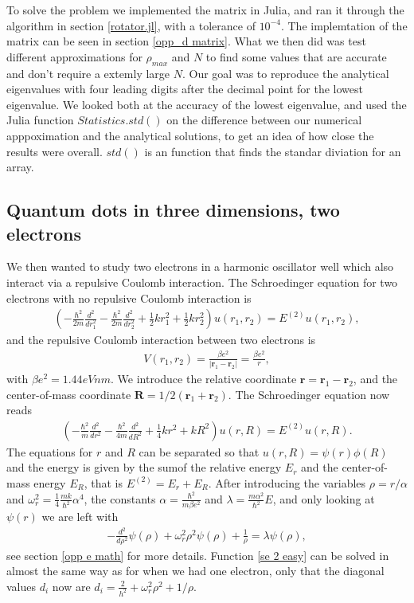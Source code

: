 \documentclass[a4paper]{article}
\begin{document}
To solve the problem we implemented the matrix in Julia, and ran it through the algorithm in section \ref{rotator.jl}, with a tolerance of $10^{-4}$. The implemtation of the matrix can be seen in section \ref{opp_d matrix}. What we then did was test different approximations for $\rho_{max}$ and $N$ to find some values that are accurate and don't require a extemly large $N$. Our goal was to reproduce the analytical eigenvalues with four leading digits after the decimal point for the lowest eigenvalue. We looked both at the accuracy of the lowest eigenvalue, and used the Julia function $Statistics.std()$ on the difference between our numerical apppoximation and the analytical solutions, to get an idea of how close the results were overall. $std()$ is an function that finds the standar diviation for an array.


\subsection{Quantum dots in three dimensions, two electrons}
We then wanted to study two electrons in a harmonic oscillator well which also interact via a repulsive Coulomb interaction. The Schroedinger equation for two electrons with no repulsive Coulomb interaction is
\begin{align}
\left(  -\frac{\hbar^2}{2 m} \frac{d^2}{dr_1^2} -\frac{\hbar^2}{2 m} \frac{d^2}{dr_2^2}+ \frac{1}{2}k r_1^2+ \frac{1}{2}k r_2^2\right)u(r_1,r_2)  = E^{(2)} u(r_1,r_2) ,
\end{align}
and the repulsive Coulomb interaction between two electrons is
\begin{align}
V(r_1,r_2) = \frac{\beta e^2}{|\mathbf{r}_1-\mathbf{r}_2|}=\frac{\beta e^2}{r},
\end{align}
with $ \beta e^2 = 1.44 eVnm$. We introduce the relative coordinate $\mathbf{r} = \mathbf{r}_1-\mathbf{r}_2$, and the center-of-mass coordinate $\mathbf{R} = 1/2(\mathbf{r}_1+\mathbf{r}_2)$. The Schroedinger equation now reads
\begin{align}
\left(  -\frac{\hbar^2}{m} \frac{d^2}{dr^2} -\frac{\hbar^2}{4 m} \frac{d^2}{dR^2}+ \frac{1}{4} k r^2+  kR^2\right)u(r,R)  = E^{(2)} u(r,R).
\end{align}
The equations for $r$ and $R$ can be separated so that $u(r,R) = \psi(r)\phi(R)$ and the energy is given by the sumof the relative energy $E_r$ and the center-of-mass energy $E_R$, that is $ E^{(2)} = E_r + E_R$. After introducing the variables $\rho = r/\alpha$ and $\omega_r^2=\frac{1}{4}\frac{mk}{\hbar^2} \alpha^4$, the constants $\alpha = \frac{\hbar^2}{m\beta e^2}$ and $\lambda = \frac{m\alpha^2}{\hbar^2}E$, and only looking at $\psi (r)$ we are left with 
\begin{align}
  -\frac{d^2}{d\rho^2} \psi(\rho) + \omega_r^2\rho^2\psi(\rho) +\frac{1}{\rho} = \lambda \psi(\rho), \label{se 2 easy}
\end{align}
see section \ref{opp e math} for more details. Function \ref{se 2 easy} can be solved in almost the same way as for when we had one electron, only that the diagonal values $d_i$ now are $d_i = \frac{2}{h^2} + \omega_r^2\rho^2+1/\rho$. 
\end{document}
